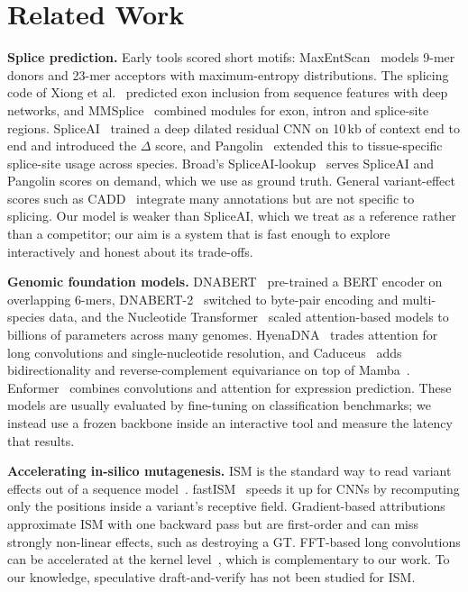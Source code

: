 \documentclass[conference]{IEEEtran}
\begin{document}
\section{Related Work}\label{sec:related}
\textbf{Splice prediction.} Early tools scored short motifs: MaxEntScan~\cite{yeo2004maxent} models 9-mer donors and 23-mer acceptors with maximum-entropy distributions. The splicing code of Xiong et al.~\cite{xiong2015splicingcode} predicted exon inclusion from sequence features with deep networks, and MMSplice~\cite{cheng2019mmsplice} combined modules for exon, intron and splice-site regions. SpliceAI~\cite{jaganathan2019spliceai} trained a deep dilated residual CNN on 10\,kb of context end to end and introduced the $\Delta$ score, and Pangolin~\cite{zeng2022pangolin} extended this to tissue-specific splice-site usage across species. Broad's SpliceAI-lookup~\cite{spliceailookup} serves SpliceAI and Pangolin scores on demand, which we use as ground truth. General variant-effect scores such as CADD~\cite{kircher2014cadd} integrate many annotations but are not specific to splicing. Our model is weaker than SpliceAI, which we treat as a reference rather than a competitor; our aim is a system that is fast enough to explore interactively and honest about its trade-offs.

\textbf{Genomic foundation models.} DNABERT~\cite{ji2021dnabert} pre-trained a BERT encoder on overlapping 6-mers, DNABERT-2~\cite{zhou2024dnabert2} switched to byte-pair encoding and multi-species data, and the Nucleotide Transformer~\cite{dallatorre2025nt} scaled attention-based models to billions of parameters across many genomes. HyenaDNA~\cite{nguyen2023hyenadna} trades attention for long convolutions and single-nucleotide resolution, and Caduceus~\cite{schiff2024caduceus} adds bidirectionality and reverse-complement equivariance on top of Mamba~\cite{gu2023mamba}. Enformer~\cite{avsec2021enformer} combines convolutions and attention for expression prediction. These models are usually evaluated by fine-tuning on classification benchmarks; we instead use a frozen backbone inside an interactive tool and measure the latency that results.

\textbf{Accelerating in-silico mutagenesis.} ISM is the standard way to read variant effects out of a sequence model~\cite{alipanahi2015deepbind}. fastISM~\cite{nair2022fastism} speeds it up for CNNs by recomputing only the positions inside a variant's receptive field. Gradient-based attributions~\cite{simonyan2013saliency,shrikumar2017deeplift,sundararajan2017ig} approximate ISM with one backward pass but are first-order and can miss strongly non-linear effects, such as destroying a GT. FFT-based long convolutions can be accelerated at the kernel level~\cite{fu2024flashfftconv}, which is complementary to our work. To our knowledge, speculative draft-and-verify has not been studied for ISM.
\end{document}
